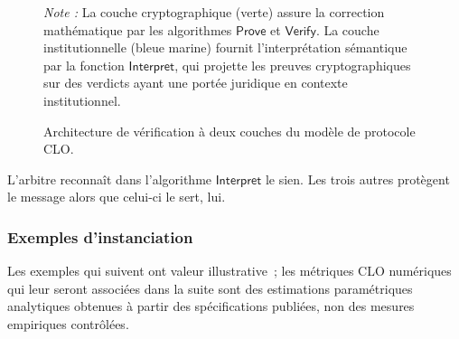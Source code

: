 \begin{sloppypar}
\begin{figure}[htbp]
\caption[Architecture de v\'erification \`a deux couches du mod\`ele de protocole CLO]{%
  Architecture de v\'erification \`a deux couches du mod\`ele de protocole CLO.%
}\label{fig:clo_model}

\smallskip
\begin{minipage}{\linewidth}
  \small\textit{Note :} La couche cryptographique (verte) assure la correction
  math\'ematique par les algorithmes $\mathsf{Prove}$ et $\mathsf{Verify}$.
  La couche institutionnelle (bleue marine) fournit l'interpr\'etation s\'emantique
  par la fonction $\mathsf{Interpret}$, qui projette les preuves cryptographiques
  sur des verdicts ayant une port\'ee juridique en contexte institutionnel.
\end{minipage}

\end{figure}
\begin{boiteArbitre}
L'arbitre reconna\^it dans l'algorithme $\mathsf{Interpret}$ le sien. Les trois
autres prot\`egent le message alors que celui-ci le sert, lui.
\end{boiteArbitre}

\subsubsection{Exemples d'instanciation}
\label{subsubsec:exemples_instanciation}

Les exemples qui suivent ont valeur illustrative~; les m\'etriques CLO
num\'eriques qui leur seront associ\'ees dans la suite sont des estimations
param\'etriques analytiques obtenues \`a partir des sp\'ecifications publi\'ees,
non des mesures empiriques contr\^ol\'ees.


\end{sloppypar}
